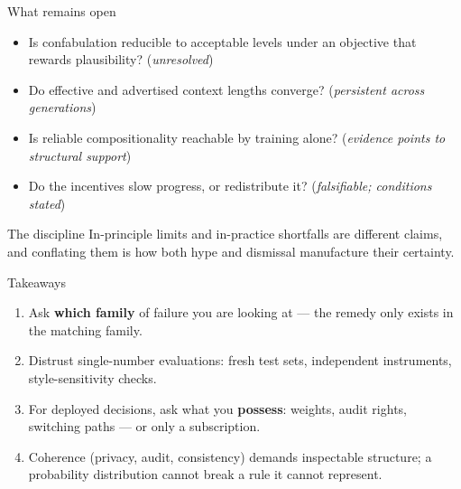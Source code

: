 \documentclass[11pt]{beamer}
\begin{document}
\begin{frame}{What remains open}
  \begin{itemize}
    \item Is confabulation reducible to acceptable levels under an objective
          that rewards plausibility? (\emph{unresolved})
    \item Do effective and advertised context lengths converge?
          (\emph{persistent across generations})
    \item Is reliable compositionality reachable by training alone?
          (\emph{evidence points to structural support})
    \item Do the incentives slow progress, or redistribute it?
          (\emph{falsifiable; conditions stated})
  \end{itemize}
  \begin{block}{The discipline}
    In-principle limits and in-practice shortfalls are different claims,
    and conflating them is how both hype and dismissal manufacture
    their certainty.
  \end{block}
\end{frame}

\begin{frame}{Takeaways}
  \begin{enumerate}
    \item Ask \textbf{which family} of failure you are looking at --- the
          remedy only exists in the matching family.
    \item Distrust single-number evaluations: fresh test sets, independent
          instruments, style-sensitivity checks.
    \item For deployed decisions, ask what you \textbf{possess}: weights,
          audit rights, switching paths --- or only a subscription.
    \item Coherence (privacy, audit, consistency) demands inspectable
          structure; a probability distribution cannot break a rule it
          cannot represent.
  \end{enumerate}
\end{frame}
\end{document}
